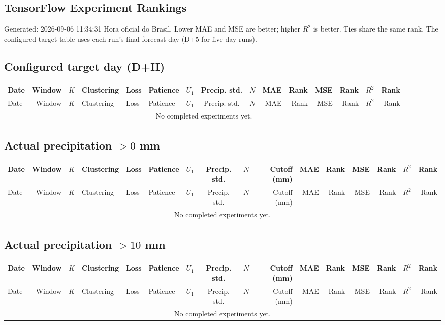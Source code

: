 \documentclass[10pt]{article}
\begin{document}
\begin{landscape}
\section*{TensorFlow Experiment Rankings}
Generated: 2026-09-06 11:34:31 Hora oficial do Brasil. Lower MAE and MSE are better; higher $R^2$ is better. Ties share the same rank. The configured-target table uses each run's final forecast day (D+5 for five-day runs).
\subsection*{Configured target day (D+H)}
\footnotesize
\setlength{\tabcolsep}{3pt}
\begin{longtable}{@{}lrrlllrcrrrrrrr@{}}
\toprule
Date & Window & $K$ & Clustering & Loss & Patience & $U_1$ & Precip. std. & $N$ & MAE & Rank & MSE & Rank & $R^2$ & Rank \\
\midrule
\endfirsthead
\toprule
Date & Window & $K$ & Clustering & Loss & Patience & $U_1$ & Precip. std. & $N$ & MAE & Rank & MSE & Rank & $R^2$ & Rank \\
\midrule
\endhead
\multicolumn{15}{c}{No completed experiments yet.} \\
\bottomrule
\end{longtable}
\clearpage
\subsection*{Actual precipitation $>0$ mm}
\footnotesize
\setlength{\tabcolsep}{3pt}
\begin{longtable}{@{}lrrlllrcrrrrrrrr@{}}
\toprule
Date & Window & $K$ & Clustering & Loss & Patience & $U_1$ & Precip. std. & $N$ & Cutoff (mm) & MAE & Rank & MSE & Rank & $R^2$ & Rank \\
\midrule
\endfirsthead
\toprule
Date & Window & $K$ & Clustering & Loss & Patience & $U_1$ & Precip. std. & $N$ & Cutoff (mm) & MAE & Rank & MSE & Rank & $R^2$ & Rank \\
\midrule
\endhead
\multicolumn{16}{c}{No completed experiments yet.} \\
\bottomrule
\end{longtable}
\clearpage
\subsection*{Actual precipitation $>10$ mm}
\footnotesize
\setlength{\tabcolsep}{3pt}
\begin{longtable}{@{}lrrlllrcrrrrrrrr@{}}
\toprule
Date & Window & $K$ & Clustering & Loss & Patience & $U_1$ & Precip. std. & $N$ & Cutoff (mm) & MAE & Rank & MSE & Rank & $R^2$ & Rank \\
\midrule
\endfirsthead
\toprule
Date & Window & $K$ & Clustering & Loss & Patience & $U_1$ & Precip. std. & $N$ & Cutoff (mm) & MAE & Rank & MSE & Rank & $R^2$ & Rank \\
\midrule
\endhead
\multicolumn{16}{c}{No completed experiments yet.} \\
\bottomrule
\end{longtable}
\clearpage

\end{landscape}
\end{document}
